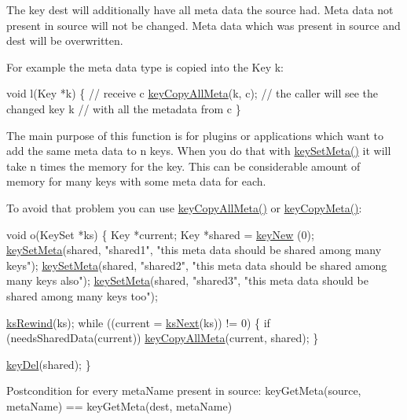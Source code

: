 The key dest will additionally have all meta data the source had. Meta data not present in source will not be changed. Meta data which was present in source and dest will be overwritten.

For example the meta data type is copied into the Key k\+:


\begin{DoxyCodeInclude}
\textcolor{keywordtype}{void} l(Key *k)
\{
        \textcolor{comment}{// receive c}
        \hyperlink{group__keymeta_ga8e63720a65610a29597494d0671f9401}{keyCopyAllMeta}(k, c);
        \textcolor{comment}{// the caller will see the changed key k}
        \textcolor{comment}{// with all the metadata from c}
\}
\end{DoxyCodeInclude}
 The main purpose of this function is for plugins or applications which want to add the same meta data to n keys. When you do that with \hyperlink{group__keymeta_gae1f15546b234ffb6007d8a31178652b9}{key\+Set\+Meta()} it will take n times the memory for the key. This can be considerable amount of memory for many keys with some meta data for each.

To avoid that problem you can use \hyperlink{group__keymeta_ga8e63720a65610a29597494d0671f9401}{key\+Copy\+All\+Meta()} or \hyperlink{group__keymeta_ga9a22b992478e613c8788bd460b4a1f0c}{key\+Copy\+Meta()}\+:


\begin{DoxyCodeInclude}
\textcolor{keywordtype}{void} o(KeySet *ks)
\{
        Key *current;
        Key *shared = \hyperlink{group__key_gad23c65b44bf48d773759e1f9a4d43b89}{keyNew} (0);
        \hyperlink{group__keymeta_gae1f15546b234ffb6007d8a31178652b9}{keySetMeta}(shared, \textcolor{stringliteral}{"shared1"}, \textcolor{stringliteral}{"this meta data should be shared among many keys"});
        \hyperlink{group__keymeta_gae1f15546b234ffb6007d8a31178652b9}{keySetMeta}(shared, \textcolor{stringliteral}{"shared2"}, \textcolor{stringliteral}{"this meta data should be shared among many keys also"});
        \hyperlink{group__keymeta_gae1f15546b234ffb6007d8a31178652b9}{keySetMeta}(shared, \textcolor{stringliteral}{"shared3"}, \textcolor{stringliteral}{"this meta data should be shared among many keys too"});

        \hyperlink{group__keyset_gabe793ff51f1728e3429c84a8a9086b70}{ksRewind}(ks);
        \textcolor{keywordflow}{while} ((current = \hyperlink{group__keyset_ga317321c9065b5a4b3e33fe1c399bcec9}{ksNext}(ks)) != 0)
        \{
                \textcolor{keywordflow}{if} (needsSharedData(current)) \hyperlink{group__keymeta_ga8e63720a65610a29597494d0671f9401}{keyCopyAllMeta}(current, shared);
        \}

        \hyperlink{group__key_ga3df95bbc2494e3e6703ece5639be5bb1}{keyDel}(shared);
\}
\end{DoxyCodeInclude}
 \begin{DoxyPostcond}{Postcondition}
for every meta\+Name present in source\+: key\+Get\+Meta(source, meta\+Name) == key\+Get\+Meta(dest, meta\+Name)
\end{DoxyPostcond}

